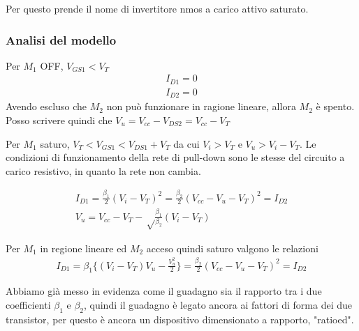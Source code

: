 \documentclass[../template]{subfiles}
\begin{document}
Per questo prende il nome di invertitore nmos a carico attivo saturato.


\subsubsection{Analisi del modello}
\begin{tcolorbox}
    Per $M_1$ OFF, $V_{GS1} < V_T$
    \begin{align*}
        I_{D1} = 0
        \\
        I_{D2} = 0
    \end{align*}
    Avendo escluso che $M_2$ non può funzionare in ragione lineare, allora $M_2$ è spento.
    Posso scrivere quindi che $V_u = V_{cc} - V_{DS2} = V_{cc} - V_T$

\end{tcolorbox}
\begin{tcolorbox}
    Per $M_1$ saturo, $V_T < V_{GS1} < V_{DS1} + V_T$ da cui $V_i > V_T$ e $V_u > V_i - V_T$.
    Le condizioni di funzionamento della rete di pull-down sono le stesse del circuito a carico resistivo, in quanto la rete non cambia.

    \begin{align*}
        I_{D1} = \frac{\beta_1}{2} (V_i - V_T)^2 = \frac{\beta_2}{2} (V_{cc} - V_u - V_T)^2 = I_{D2}
        \\
        V_u = V_{cc} - V_T - \sqrt\frac{\beta_1}{\beta_2} (V_i - V_T)
    \end{align*}
\end{tcolorbox}
\begin{tcolorbox}
    Per $M_1$ in regione lineare ed $M_2$ acceso quindi saturo valgono le relazioni
    \begin{align*}
        I_{D1} = \beta_1 \big\{ (V_i - V_T) V_u - \frac{V_u^2}{2}\big\}
        = \frac{\beta_2}{2} (V_{cc} - V_u - V_T )^2 = I_{D2}
    \end{align*}
\end{tcolorbox}

Abbiamo già messo in evidenza come il guadagno sia il rapporto tra i due coefficienti $\beta_1$ e $\beta_2$, quindi il guadagno è legato ancora ai fattori di forma dei due transistor, per questo è ancora un dispositivo dimensionato a rapporto, "ratioed".
\end{document}
